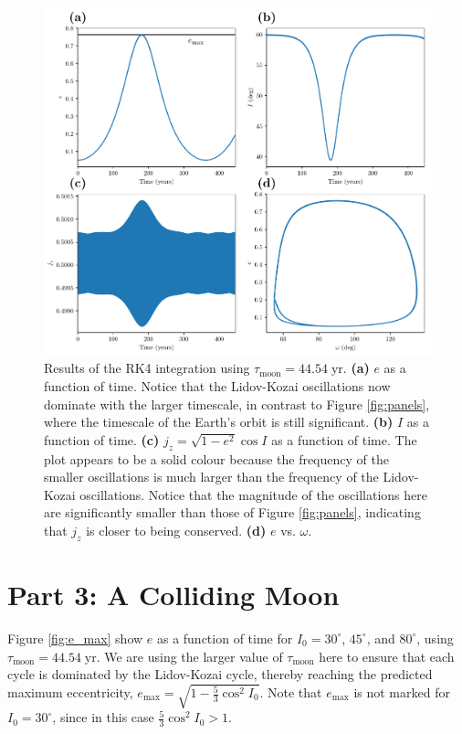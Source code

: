 \documentclass[11pt]{article}
\begin{document}
\begin{figure}[h!]
    \centering
    \includegraphics[width=\textwidth]{plots/figure2.pdf}
    \caption{Results of the RK4 integration using $\tau_\mathrm{moon} = 44.54 \; \mathrm{yr}$. \textbf{(a)} $e$ as a function of time. Notice that the Lidov-Kozai oscillations now dominate with the larger timescale, in contrast to Figure \ref{fig:panels}, where the timescale of the Earth's orbit is still significant. \textbf{(b)} $I$ as a function of time. \textbf{(c)}  $j_z = \sqrt{1-e^2} \cos I$ as a function of time. The plot appears to be a solid colour because the frequency of the smaller oscillations is much larger than the frequency of the Lidov-Kozai oscillations. Notice that the magnitude of the oscillations here are significantly smaller than those of Figure \ref{fig:panels}, indicating that $j_z$ is closer to being conserved. \textbf{(d)} $e$ vs. $\omega$.}
    \label{fig:panels_close}
\end{figure}

\section*{Part 3: A Colliding Moon}
Figure \ref{fig:e_max} show $e$ as a function of time for $I_0 = 30^\circ$, $45^\circ$, and $80^\circ$, using $\tau_\mathrm{moon} = 44.54 \; \mathrm{yr}$. We are using the larger value of $\tau_\mathrm{moon}$ here to ensure that each cycle is dominated by the Lidov-Kozai cycle, thereby reaching the predicted maximum eccentricity, $e_\mathrm{max} = \sqrt{1 - \tfrac{5}{3} \cos^2 I_0}$. Note that $e_\mathrm{max}$ is not marked for $I_0 = 30^\circ$, since in this case $\tfrac{5}{3} \cos^2 I_0 > 1$.
\end{document}
